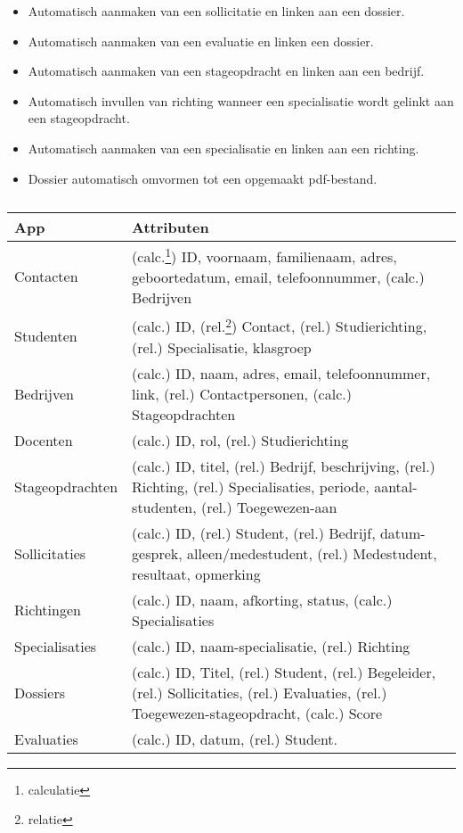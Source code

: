 \begin{itemize}
    \item Automatisch aanmaken van een sollicitatie en linken aan een dossier.
    \item Automatisch aanmaken van een evaluatie en linken een dossier.
    \item Automatisch aanmaken van een stageopdracht en linken aan een bedrijf.
    \item Automatisch invullen van richting wanneer een specialisatie wordt gelinkt aan een stageopdracht.
    \item Automatisch aanmaken van een specialisatie en linken aan een richting.
    \item Dossier automatisch omvormen tot een opgemaakt pdf-bestand.
\end{itemize}

\begin{table}
    \centering
    \caption{\label{tab:Resultaat analyse} }
    \begin{tabular}{ | p{4cm} | p{8cm} | }
        \hline
        \textbf{App} & \textbf{Attributen} \\
        \hline\hline
        Contacten       & (calc.\footnote{calculatie}) ID, voornaam, familienaam, adres, geboortedatum, email, telefoonnummer, (calc.) Bedrijven \\
        Studenten       & (calc.) ID, (rel.\footnote{relatie}) Contact, (rel.) Studierichting, (rel.)  Specialisatie, klasgroep \\
        Bedrijven       & (calc.) ID, naam, adres, email, telefoonnummer, link, (rel.) Contactpersonen, (calc.) Stageopdrachten \\
        Docenten        & (calc.) ID, rol, (rel.) Studierichting \\
        Stageopdrachten & (calc.) ID, titel, (rel.) Bedrijf, beschrijving, (rel.) Richting, (rel.) Specialisaties, periode, aantal-studenten, (rel.) Toegewezen-aan \\
        Sollicitaties   & (calc.) ID, (rel.) Student, (rel.) Bedrijf, datum-gesprek, alleen/medestudent, (rel.) Medestudent, resultaat, opmerking \\
        Richtingen      & (calc.) ID, naam, afkorting, status, (calc.) Specialisaties \\
        Specialisaties  & (calc.) ID, naam-specialisatie, (rel.) Richting \\
        Dossiers        & (calc.) ID, Titel, (rel.) Student, (rel.) Begeleider, (rel.) Sollicitaties, (rel.) Evaluaties, (rel.) Toegewezen-stageopdracht, (calc.) Score \\
        Evaluaties      & (calc.) ID, datum, (rel.) Student. \\
        \hline
    \end{tabular}
\end{table}

